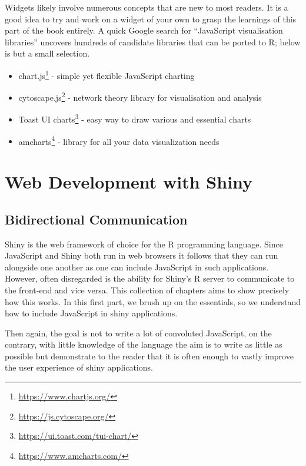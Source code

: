 \documentclass[
]{krantz}
\providecommand{\tightlist}{%
  \setlength{\itemsep}{0pt}\setlength{\parskip}{0pt}}
\renewcommand{\href}[2]{#2\footnote{\url{#1}}}
\begin{document}
Widgets likely involve numerous concepts that are new to most readers. It is a good idea to try and work on a widget of your own to grasp the learnings of this part of the book entirely. A quick Google search for ``JavaScript visualisation libraries'' uncovers hundreds of candidate libraries that can be ported to R; below is but a small selection.

\begin{itemize}
\tightlist
\item
  \href{https://www.chartjs.org/}{chart.js} - simple yet flexible JavaScript charting
\item
  \href{https://js.cytoscape.org/}{cytoscape.js} - network theory library for visualisation and analysis
\item
  \href{https://ui.toast.com/tui-chart/}{Toast UI charts} - easy way to draw various and essential charts
\item
  \href{https://www.amcharts.com/}{amcharts} - library for all your data visualization needs
\end{itemize}

\hypertarget{part-web-development-with-shiny}{%
\part{Web Development with Shiny}\label{part-web-development-with-shiny}}

\hypertarget{shiny-intro}{%
\chapter{Bidirectional Communication}\label{shiny-intro}}

Shiny is the web framework of choice for the R programming language. Since JavaScript and Shiny both run in web browsers it follows that they can run alongside one another as one can include JavaScript in such applications. However, often disregarded is the ability for Shiny's R server to communicate to the front-end and vice versa. This collection of chapters aims to show precisely how this works. In this first part, we brush up on the essentials, so we understand how to include JavaScript in shiny applications.

Then again, the goal is not to write a lot of convoluted JavaScript, on the contrary, with little knowledge of the language the aim is to write as little as possible but demonstrate to the reader that it is often enough to vastly improve the user experience of shiny applications.
\end{document}
